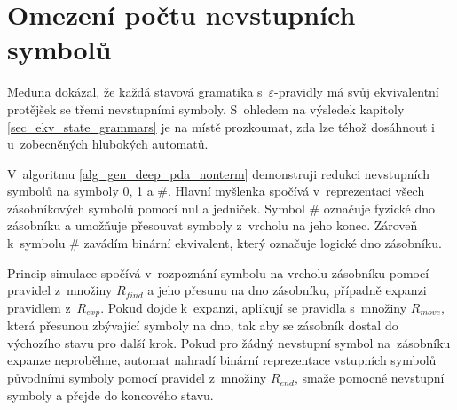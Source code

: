 \section{Omezení počtu nevstupních symbolů}

Meduna \cite{Meduna:StateGrammars} dokázal, že každá stavová gramatika s~$\varepsilon$-pravidly má svůj ekvivalentní protějšek se třemi nevstupními symboly. S~ohledem na výsledek kapitoly \ref{sec_ekv_state_grammars} je na místě prozkoumat, zda lze téhož dosáhnout i u~zobecněných hlubokých automatů.

V~algoritmu \ref{alg_gen_deep_pda_nonterm} demonstruji redukci nevstupních symbolů na symboly 0, 1 a \#. Hlavní myšlenka spočívá v~reprezentaci všech zásobníkových symbolů pomocí nul a jedniček. Symbol \# označuje fyzické dno zásobníku a umožňuje přesouvat symboly z~vrcholu na jeho konec. Zároveň k~symbolu \# zavádím binární ekvivalent, který označuje logické dno zásobníku. 

Princip simulace spočívá v~rozpoznání symbolu na vrcholu zásobníku pomocí pravidel z~množiny $R_{find}$ a jeho přesunu na dno zásobníku, případně expanzi pravidlem z~$R_{exp}$. Pokud dojde k~expanzi, aplikují se pravidla s~množiny $R_{move}$, která přesunou zbývající symboly na dno, tak aby se zásobník dostal do výchozího stavu pro další krok. Pokud pro žádný nevstupní symbol na~zásobníku expanze neproběhne, automat nahradí binární reprezentace vstupních symbolů původními symboly pomocí pravidel z~množiny $R_{end}$, smaže pomocné nevstupní symboly a přejde do koncového stavu.

